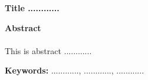 
\begin{center}
	\huge \textbf{Title ............}
\end{center}

\large \textbf{Abstract}

\paragraph*{}

This is abstract ............

\large \textbf{Keywords:} ............, ............, ............